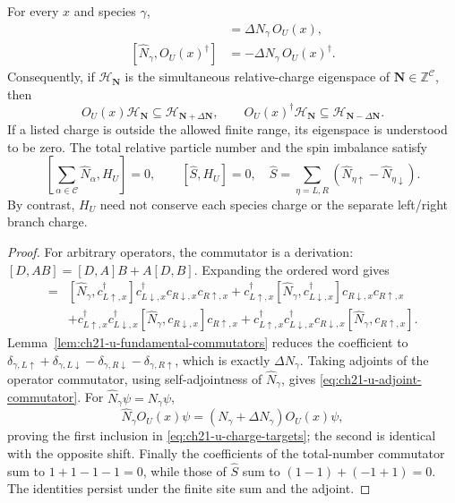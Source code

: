 \begin{theorem}
\label{thm:ch21-u-charge-shift}
For every \(x\) and species \(\gamma\),
\begin{align}
 [\widehat N_\gamma,O_U(x)]
   &=\Delta N_\gamma\,O_U(x),
 \label{eq:ch21-u-commutator}\\
 [\widehat N_\gamma,O_U(x)^\dagger]
   &=-\Delta N_\gamma\,O_U(x)^\dagger.
 \label{eq:ch21-u-adjoint-commutator}
\end{align}
Consequently, if \(\mathcal H_{\mathbf N}\) is the simultaneous
relative-charge eigenspace of \(\mathbf N\in\mathbb Z^{\mathcal C}\), then
\begin{equation}
 O_U(x)\mathcal H_{\mathbf N}\subseteq
     \mathcal H_{\mathbf N+\Delta\mathbf N},\qquad
 O_U(x)^\dagger\mathcal H_{\mathbf N}\subseteq
     \mathcal H_{\mathbf N-\Delta\mathbf N}.
 \label{eq:ch21-u-charge-targets}
\end{equation}
If a listed charge is outside the allowed finite range, its eigenspace
is understood to be zero.  The total relative particle number and the
spin imbalance satisfy
\begin{equation}
 \left[\sum_{\alpha\in\mathcal C}\widehat N_\alpha,H_U\right]=0,
 \qquad
 [\widehat S,H_U]=0,
 \quad \widehat S=\sum_{\eta=L,R}
        (\widehat N_{\eta\uparrow}-\widehat N_{\eta\downarrow}).
 \label{eq:ch21-u-conserved-totals}
\end{equation}
By contrast, \(H_U\) need not conserve each species charge or the
separate left/right branch charge.
\end{theorem}
\begin{proof}
For arbitrary operators, the commutator is a derivation:
\([D,AB]=[D,A]B+A[D,B]\).  Expanding the ordered word gives
\begin{align*}
 [\widehat N_\gamma,O_U(x)]={}&
   [\widehat N_\gamma,c_{L\uparrow,x}^\dagger]
           c_{L\downarrow,x}^\dagger c_{R\downarrow,x}c_{R\uparrow,x}
 +c_{L\uparrow,x}^\dagger
   [\widehat N_\gamma,c_{L\downarrow,x}^\dagger]
           c_{R\downarrow,x}c_{R\uparrow,x}\\
 &+c_{L\uparrow,x}^\dagger c_{L\downarrow,x}^\dagger
   [\widehat N_\gamma,c_{R\downarrow,x}]c_{R\uparrow,x}
 +c_{L\uparrow,x}^\dagger c_{L\downarrow,x}^\dagger
   c_{R\downarrow,x}[\widehat N_\gamma,c_{R\uparrow,x}].
\end{align*}
Lemma~\ref{lem:ch21-u-fundamental-commutators} reduces the coefficient
to
\(\delta_{\gamma,L\uparrow}+\delta_{\gamma,L\downarrow}
-\delta_{\gamma,R\downarrow}-\delta_{\gamma,R\uparrow}\), which is
exactly \(\Delta N_\gamma\).  Taking adjoints of the operator
commutator, using self-adjointness of \(\widehat N_\gamma\), gives
\eqref{eq:ch21-u-adjoint-commutator}.  For
\(\widehat N_\gamma\psi=N_\gamma\psi\),
\[
 \widehat N_\gamma O_U(x)\psi
  =(N_\gamma+\Delta N_\gamma)O_U(x)\psi,
\]
proving the first inclusion in \eqref{eq:ch21-u-charge-targets};
the second is identical with the opposite shift.  Finally the
coefficients of the total-number commutator sum to \(1+1-1-1=0\),
while those of \(\widehat S\) sum to \((1-1)+(-1+1)=0\).
The identities persist under the finite site sum and the adjoint.
\end{proof}

